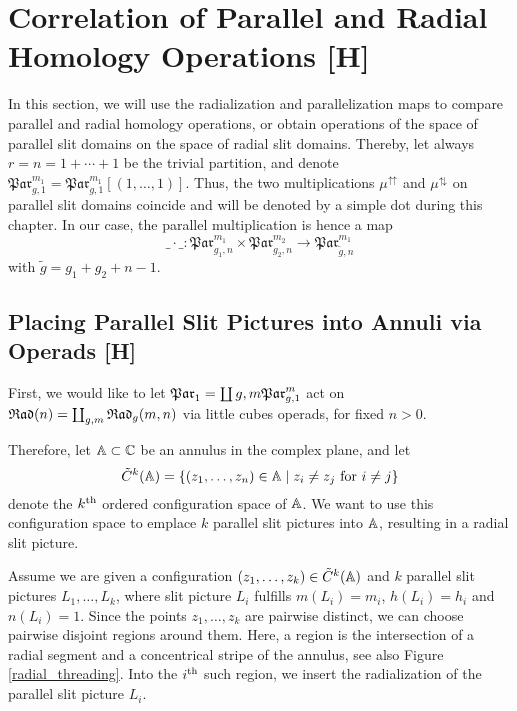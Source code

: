 \section{Correlation of Parallel and Radial Homology Operations [H]}
\label{homology_operations:comparision_of_par_and_rad}

In this section, we will use the radialization and parallelization maps to compare parallel and radial homology operations,
or obtain operations of the space of parallel slit domains on the space of radial slit domains.
Thereby, let always $r = n = 1 + \dotsb + 1$ be the trivial partition, and denote $\mathfrak{Par}_{g, 1}^{m_1} = \mathfrak{Par}_{g, 1}^{m_1}[(1, \dotsc, 1)]$.
Thus, the two multiplications $\mu^{\upuparrows}$ and $\mu^{\updownarrows}$ on parallel slit domains coincide 
and will be denoted by a simple dot during this chapter.
In our case, the parallel multiplication is hence a map
\[
   \_\cdot\_ \colon \mathfrak{Par}_{g_1, n}^{m_1} \times \mathfrak{Par}_{g_2, n}^{m_2} \to \mathfrak{Par}_{\tilde g, n}^{m_1} 
\]
with $\tilde g = g_1 + g_2 + n - 1$.

\subsection{Placing Parallel Slit Pictures into Annuli via Operads [H]}
\label{par_into_annulus}

First, we would like to let $\mathfrak{Par}_1 = \coprod{g, m} \mathfrak{Par}_{g, 1}^m$ act on $\mathfrak{Rad}(n) = \coprod_{g, m} {\mathfrak{Rad}_g(m,n)}$ via little cubes operads, for fixed $n > 0$.

Therefore, let $\mathbb A \subset \mathbb C$ be an annulus in the complex plane, 
and let
\label{conf_space_annuli}
\[
   \tilde C^k(\mathbb A) = \{(z_1, \dotsc, z_n) \in \mathbb A \mid z_i \neq z_j \text{ for } i \neq j\}
\]
denote the $k^{\text{th}}$ ordered configuration space of $\mathbb A$. 
We want to use this configuration space to emplace $k$ parallel slit pictures into $\mathbb A$,
resulting in a radial slit picture.

Assume we are given a configuration $(z_1, \dotsc, z_k) \in \tilde C^k(\mathbb A)$ and $k$ parallel slit pictures $L_1, \dotsc, L_k$,
where slit picture $L_i$ fulfills $m(L_i) = m_i$, $h(L_i) = h_i$ and $n(L_i) = 1$.
Since the points $z_1, \dotsc, z_k$ are pairwise distinct, we can choose pairwise disjoint regions around them.
Here, a region is the intersection of a radial segment and a concentrical stripe of the annulus, see also Figure \ref{radial_threading}.
Into the $i^{\text{th}}$ such region, we insert the radialization of the parallel slit picture $L_i$.

